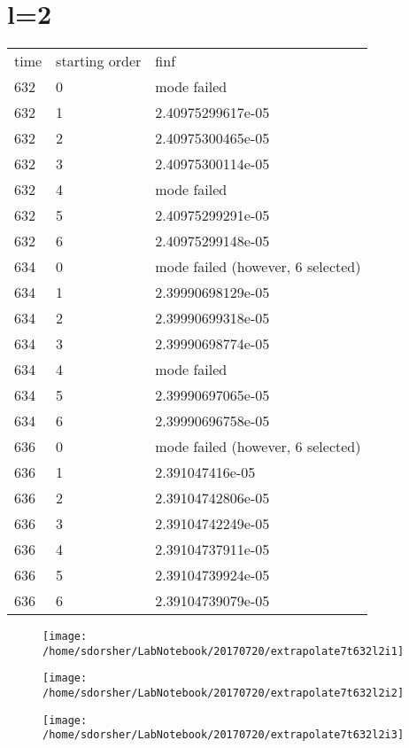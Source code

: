 \documentclass{article}
\begin{document}
\section{l=2}
\begin{table}
  \begin{tabular}{lll}
    time & starting order & finf\\
    632 & 0 & mode failed\\
    632 & 1 & 2.40975299617e-05\\
    632 & 2 & 2.40975300465e-05\\
    632 & 3 & 2.40975300114e-05\\
    632 & 4 & mode failed\\
    632 & 5 & 2.40975299291e-05\\
    632 & 6 & 2.40975299148e-05\\
    \hline
    634 & 0 & mode failed (however, 6 selected)\\
    634 & 1 & 2.39990698129e-05\\
    634 & 2 & 2.39990699318e-05\\
    634 & 3 & 2.39990698774e-05\\
    634 & 4 & mode failed\\
    634 & 5 & 2.39990697065e-05\\
    634 & 6 & 2.39990696758e-05\\
    \hline
    636 & 0 & mode failed (however, 6 selected)\\
    636 & 1 & 2.391047416e-05\\
    636 & 2 & 2.39104742806e-05\\
    636 & 3 & 2.39104742249e-05\\
    636 & 4 & 2.39104737911e-05\\
    636 & 5 & 2.39104739924e-05\\
    636 & 6 & 2.39104739079e-05\\
  \end{tabular}
\end{table}

\begin{figure}
  \texttt{[image: /home/sdorsher/LabNotebook/20170720/extrapolate7t632l2i1]}
\end{figure}

\begin{figure}
  \texttt{[image: /home/sdorsher/LabNotebook/20170720/extrapolate7t632l2i2]}
\end{figure}

\begin{figure}
  \texttt{[image: /home/sdorsher/LabNotebook/20170720/extrapolate7t632l2i3]}
\end{figure}
\end{document}
